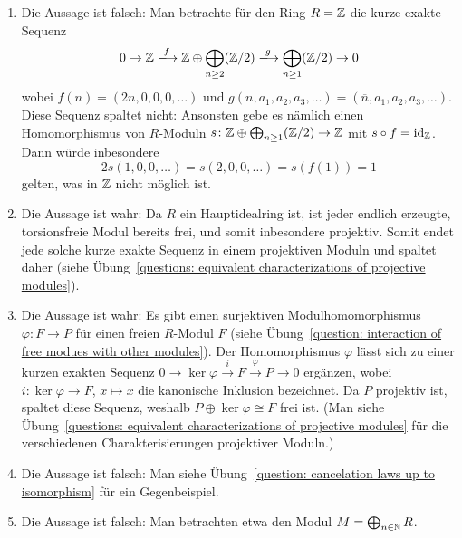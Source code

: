 \begin{solution}
\begin{enumerate}
    \item
      Die Aussage ist falsch:
      Man betrachte für den Ring $R = \mathbb{Z}$ die kurze exakte Sequenz
      \[
                            0
        \to                 \Integer
        \xlongrightarrow{f} \Integer \oplus \bigoplus_{n \geq 2} (\Integer/2)
        \xlongrightarrow{g} \bigoplus_{n \geq 1} (\Integer/2)
        \to                 0
      \]
      wobei $f(n) = (2n,0,0,0,\dotsc)$ und $g(n, a_1, a_2, a_3, \dotsc) = (\overline{n}, a_1, a_2, a_3, \dotsc)$.
      Diese Sequenz spaltet nicht:
      Ansonsten gebe es nämlich einen Homomorphismus von $R$-Moduln $s \colon \mathbb{Z} \oplus \bigoplus_{n \geq 1} (\mathbb{Z}/2) \to \mathbb{Z}$ mit $s \circ f = \operatorname{id}_{\mathbb{Z}}$.
      Dann würde inbesondere
      \[
          2 s(1,0,0,\dotsc)
        = s(2,0,0,\dotsc)
        = s(f(1))
        = 1
      \]
      gelten, was in $\mathbb{Z}$ nicht möglich ist.
      
    \item
      Die Aussage ist wahr:
      Da $R$ ein Hauptidealring ist, ist jeder endlich erzeugte, torsionsfreie Modul bereits frei, und somit inbesondere projektiv.
      Somit endet jede solche kurze exakte Sequenz in einem projektiven Moduln und spaltet daher (siehe Übung~\ref{questions: equivalent characterizations of projective modules}).
    
    \item
      Die Aussage ist wahr:
      Es gibt einen surjektiven Modulhomomorphismus $\varphi \colon F \to P$ für einen freien $R$-Modul $F$ (siehe Übung~\ref{question: interaction of free modues with other modules}).
      Der Homomorphismus $\varphi$ lässt sich zu einer kurzen exakten Sequenz $0 \to \ker \varphi \xrightarrow{i} F \xrightarrow{\varphi} P \to 0$ ergänzen, wobei $i \colon \ker \varphi \to F$, $x \mapsto x$ die kanonische Inklusion bezeichnet.
      Da $P$ projektiv ist, spaltet diese Sequenz, weshalb $P \oplus \ker \varphi \cong F$ frei ist.
      (Man siehe Übung~\ref{questions: equivalent characterizations of projective modules} für die verschiedenen Charakterisierungen projektiver Moduln.)
      
    \item
      Die Aussage ist falsch:
      Man siehe Übung~\ref{question: cancelation laws up to isomorphism} für ein Gegenbeispiel.
      
    \item
      Die Aussage ist falsch:
      Man betrachten etwa den Modul $M = \bigoplus_{n \in \mathbb{N}} R$.
  \end{enumerate}
\end{solution}


